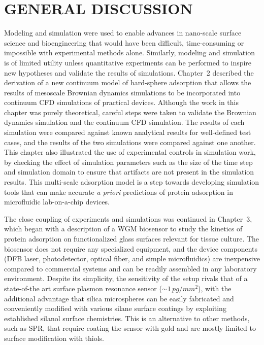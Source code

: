
\chapter{\texorpdfstring{GENERAL DISCUSSION}{CHAPTER . GENERAL DISCUSSION}}

Modeling and simulation were used to enable advances in nano-scale
surface science and bioengineering that would have been difficult,
time-consuming or impossible with experimental methods alone. Similarly,
modeling and simulation is of limited utility unless quantitative
experiments can be performed to inspire new hypotheses and validate
the results of simulations. Chapter~2 described the derivation of
a new continuum model of hard-sphere adsorption that allows the results
of mesoscale Brownian dynamics simulations to be incorporated into
continuum CFD simulations of practical devices. Although the work
in this chapter was purely theoretical, careful steps were taken to
validate the Brownian dynamics simulation and the continuum CFD simulation.
The results of each simulation were compared against known analytical
results for well-defined test cases, and the results of the two simulations
were compared against one another. This chapter also illustrated the
use of experimental controls in simulation work, by checking the effect
of simulation parameters such as the size of the time step and simulation
domain to ensure that artifacts are not present in the simulation
results. This multi-scale adsorption model is a step towards developing
simulation tools that can make accurate \emph{a priori }predictions
of protein adsorption in microfluidic lab-on-a-chip devices.

The close coupling of experiments and simulations was continued in
Chapter~3, which began with a description of a WGM biosensor to study
the kinetics of protein adsorption on functionalized glass surfaces
relevant for tissue culture. The biosensor does not require any specialized
equipment, and the device components (DFB laser, photodetector, optical
fiber, and simple microfluidics) are inexpensive compared to commercial
systems and can be readily assembled in any laboratory environment.
Despite its simplicity, the sensitivity of the setup rivals that of
a state-of-the art surface plasmon resonance sensor ($\sim1\, pg/mm^{2}$),
with the additional advantage that silica microspheres can be easily
fabricated and conveniently modified with various silane surface coatings
by exploiting established silanol surface chemistries. This is an
alternative to other methods, such as SPR, that require coating the
sensor with gold and are mostly limited to surface modification with
thiols. 

